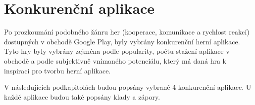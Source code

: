 \chapter{Konkurenční aplikace}
\label{chap:competitive-apps}

Po prozkoumání podobného žánru her
(kooperace, komunikace a rychlost reakcí)
dostupných v obchodě Google Play,
byly vybrány konkurenční herní aplikace.
Tyto hry byly vybrány zejména podle popularity,
počtu stažení aplikace v obchodě
a podle subjektivně vnímaného potenciálu,
který má daná hra k inspiraci pro tvorbu herní aplikace.

V následujících podkapitolách budou popsány vybrané 4 konkurenční aplikace.
U každé aplikace budou také popsány klady a zápory.





